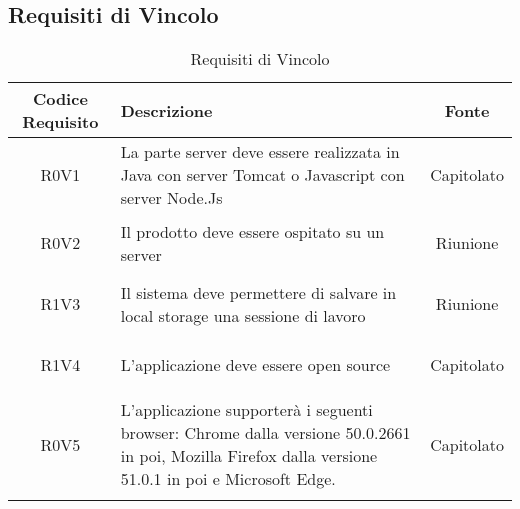 \documentclass[../AnalisiDeiRequisiti.tex]{subfiles}
\begin{document}
\subsection{Requisiti di Vincolo}
\normalsize
\begin{longtable}{|c|>{\centering}p{7cm}|c|}
	\hline
	\textbf{Codice Requisito} & \textbf{Descrizione} & \textbf{Fonte}\\
	\hline
	\endhead
	\hypertarget{R0V1}{R0V1} & La parte server deve essere realizzata in Java con server Tomcat o Javascript con server Node.Js & Capitolato \\ \hline
	\hypertarget{R0V2}{R0V2} & Il prodotto deve essere ospitato su un server & Riunione \\ \hline
	\hypertarget{R1V3}{R1V3} & Il sistema deve permettere di salvare in local storage una sessione di lavoro & Riunione \\ \hline
	\hypertarget{R1V4}{R1V4} & L'applicazione deve essere open source
	& Capitolato \\ \hline
	\hypertarget{R0V5}{R0V5} & L'applicazione supporterà i seguenti browser: Chrome dalla versione 50.0.2661 in poi, Mozilla Firefox dalla versione 51.0.1 in poi e Microsoft Edge.
	& Capitolato \\ \hline
	\caption[Requisiti di Vincolo]{Requisiti di Vincolo}
	\label{tabella:req3}
\end{longtable}
\clearpage
\end{document}
